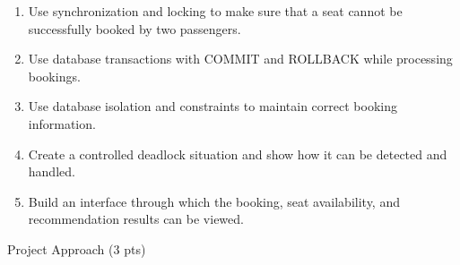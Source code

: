 \documentclass[11pt,a4paper]{article}
\newcommand{\blueheading}[1]{%
    {\sffamily\color{TitleBlue}\fontsize{15}{18}\selectfont #1}%
}
\begin{document}
{\begin{enumerate}[leftmargin=*,nosep]
    \item Use synchronization and locking to make sure that a seat cannot be successfully booked by two passengers.

    \item Use database transactions with COMMIT and ROLLBACK while processing bookings.

    \item Use database isolation and constraints to maintain correct booking information.

    \item Create a controlled deadlock situation and show how it can be detected and handled.

    \item Build an interface through which the booking, seat availability, and recommendation results can be viewed.

\end{enumerate}
}

\vspace{8mm}



\blueheading{Project Approach (3 pts)}

\vspace{4mm}
\end{document}
